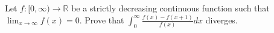 Let $f:[0,\infty)\to\mathbb{R}$ be a strictly decreasing continuous function such that $\displaystyle\lim_{x\to\infty}f(x)=0$. Prove that $\displaystyle\int_0^{\infty}\frac{f(x)-f(x+1)}{f(x)}dx$ diverges.